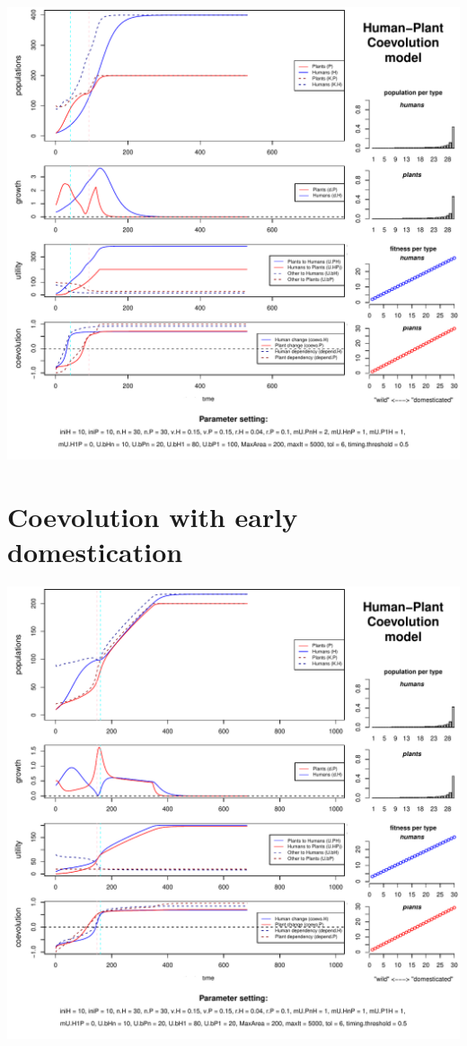 \documentclass[
]{book}
\begin{document}
\includegraphics{hpcModel-exploration_files/figure-latex/1_run.coevo.early.cult-plot-1.pdf}

\newpage

\hypertarget{coevolution-with-early-domestication}{%
\section{Coevolution with early domestication}\label{coevolution-with-early-domestication}}

\includegraphics{hpcModel-exploration_files/figure-latex/1_run.coevo.early.dom-plot-1.pdf}
\end{document}
